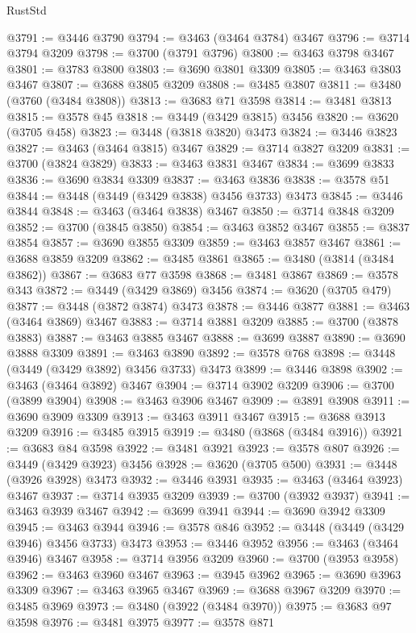 \begin{lexlean}{RustStd}
\begin{coremodule}
{{{{{{{{{{{{{{{{{{{@3791 := @3446 @3790
@3794 := @3463 (@3464 @3784) @3467
@3796 := @3714 @3794 @3209
@3798 := @3700 (@3791 @3796)
@3800 := @3463 @3798 @3467
@3801 := @3783 @3800
@3803 := @3690 @3801 @3309
@3805 := @3463 @3803 @3467
@3807 := @3688 @3805 @3209
@3808 := @3485 @3807
@3811 := @3480 (@3760 (@3484 @3808))
@3813 := @3683 @71 @3598
@3814 := @3481 @3813
@3815 := @3578 @45
@3818 := @3449 (@3429 @3815) @3456
@3820 := @3620 (@3705 @458)
@3823 := @3448 (@3818 @3820) @3473
@3824 := @3446 @3823
@3827 := @3463 (@3464 @3815) @3467
@3829 := @3714 @3827 @3209
@3831 := @3700 (@3824 @3829)
@3833 := @3463 @3831 @3467
@3834 := @3699 @3833
@3836 := @3690 @3834 @3309
@3837 := @3463 @3836
@3838 := @3578 @51
@3844 := @3448 (@3449 (@3429 @3838) @3456 @3733) @3473
@3845 := @3446 @3844
@3848 := @3463 (@3464 @3838) @3467
@3850 := @3714 @3848 @3209
@3852 := @3700 (@3845 @3850)
@3854 := @3463 @3852 @3467
@3855 := @3837 @3854
@3857 := @3690 @3855 @3309
@3859 := @3463 @3857 @3467
@3861 := @3688 @3859 @3209
@3862 := @3485 @3861
@3865 := @3480 (@3814 (@3484 @3862))
@3867 := @3683 @77 @3598
@3868 := @3481 @3867
@3869 := @3578 @343
@3872 := @3449 (@3429 @3869) @3456
@3874 := @3620 (@3705 @479)
@3877 := @3448 (@3872 @3874) @3473
@3878 := @3446 @3877
@3881 := @3463 (@3464 @3869) @3467
@3883 := @3714 @3881 @3209
@3885 := @3700 (@3878 @3883)
@3887 := @3463 @3885 @3467
@3888 := @3699 @3887
@3890 := @3690 @3888 @3309
@3891 := @3463 @3890
@3892 := @3578 @768
@3898 := @3448 (@3449 (@3429 @3892) @3456 @3733) @3473
@3899 := @3446 @3898
@3902 := @3463 (@3464 @3892) @3467
@3904 := @3714 @3902 @3209
@3906 := @3700 (@3899 @3904)
@3908 := @3463 @3906 @3467
@3909 := @3891 @3908
@3911 := @3690 @3909 @3309
@3913 := @3463 @3911 @3467
@3915 := @3688 @3913 @3209
@3916 := @3485 @3915
@3919 := @3480 (@3868 (@3484 @3916))
@3921 := @3683 @84 @3598
@3922 := @3481 @3921
@3923 := @3578 @807
@3926 := @3449 (@3429 @3923) @3456
@3928 := @3620 (@3705 @500)
@3931 := @3448 (@3926 @3928) @3473
@3932 := @3446 @3931
@3935 := @3463 (@3464 @3923) @3467
@3937 := @3714 @3935 @3209
@3939 := @3700 (@3932 @3937)
@3941 := @3463 @3939 @3467
@3942 := @3699 @3941
@3944 := @3690 @3942 @3309
@3945 := @3463 @3944
@3946 := @3578 @846
@3952 := @3448 (@3449 (@3429 @3946) @3456 @3733) @3473
@3953 := @3446 @3952
@3956 := @3463 (@3464 @3946) @3467
@3958 := @3714 @3956 @3209
@3960 := @3700 (@3953 @3958)
@3962 := @3463 @3960 @3467
@3963 := @3945 @3962
@3965 := @3690 @3963 @3309
@3967 := @3463 @3965 @3467
@3969 := @3688 @3967 @3209
@3970 := @3485 @3969
@3973 := @3480 (@3922 (@3484 @3970))
@3975 := @3683 @97 @3598
@3976 := @3481 @3975
@3977 := @3578 @871
}}}}}}}}}}}}}}}}}}}
\end{coremodule}
\end{lexlean}
